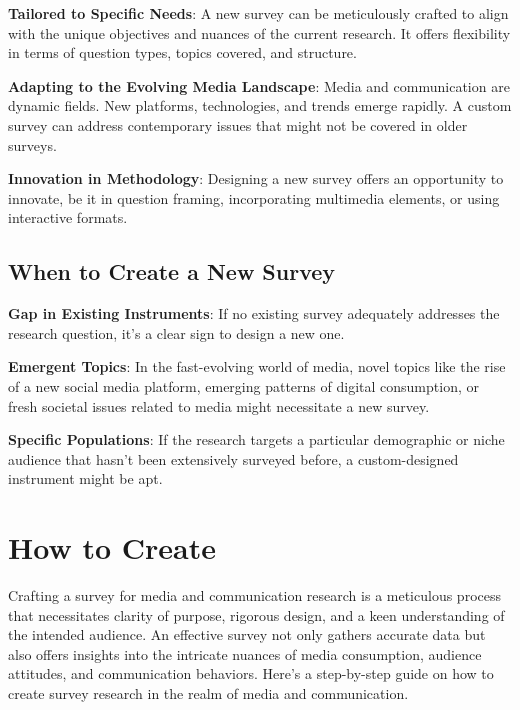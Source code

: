 \documentclass[
  b5paper]{book}
\begin{document}
\textbf{Tailored to Specific Needs}: A new survey can be meticulously crafted to align with the unique objectives and nuances of the current research.
It offers flexibility in terms of question types, topics covered, and structure.

\textbf{Adapting to the Evolving Media Landscape}: Media and communication are dynamic fields.
New platforms, technologies, and trends emerge rapidly.
A custom survey can address contemporary issues that might not be covered in older surveys.

\textbf{Innovation in Methodology}: Designing a new survey offers an opportunity to innovate, be it in question framing, incorporating multimedia elements, or using interactive formats.

\hypertarget{when-to-create-a-new-survey}{%
\subsection*{When to Create a New Survey}\label{when-to-create-a-new-survey}}

\textbf{Gap in Existing Instruments}: If no existing survey adequately addresses the research question, it's a clear sign to design a new one.

\textbf{Emergent Topics}: In the fast-evolving world of media, novel topics like the rise of a new social media platform, emerging patterns of digital consumption, or fresh societal issues related to media might necessitate a new survey.

\textbf{Specific Populations}: If the research targets a particular demographic or niche audience that hasn't been extensively surveyed before, a custom-designed instrument might be apt.

\hypertarget{how-to-create}{%
\section{How to Create}\label{how-to-create}}

Crafting a survey for media and communication research is a meticulous process that necessitates clarity of purpose, rigorous design, and a keen understanding of the intended audience.
An effective survey not only gathers accurate data but also offers insights into the intricate nuances of media consumption, audience attitudes, and communication behaviors.
Here's a step-by-step guide on how to create survey research in the realm of media and communication.
\end{document}
